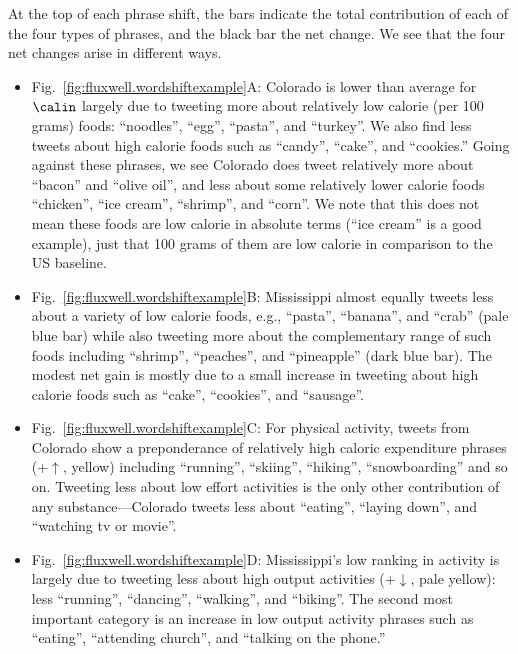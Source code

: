 At the top of each phrase shift, the bars indicate the total
contribution of each of the four types of phrases, and the black
bar the net change.
We see that the four net changes arise in different ways.
\begin{itemize}
\item 
  Fig.~\ref{fig:fluxwell.wordshiftexample}A:
  Colorado is lower than average for $\calin$ largely due
  to tweeting more about relatively low calorie (per 100 grams) foods: ``noodles'',
  ``egg'', ``pasta'', and ``turkey''.  
  We also find
  less tweets about high calorie foods such as ``candy'', ``cake'',
  and ``cookies.''
  Going against these phrases, we see 
  Colorado does tweet relatively more about ``bacon'' and ``olive oil'',
  and less about some relatively lower calorie foods ``chicken'', ``ice
  cream'', ``shrimp'', and ``corn''.
  We note that this does not mean these foods are low calorie
  in absolute terms
  (``ice cream'' is a good example),
  just that 100 grams of them are low calorie in comparison to the US
  baseline.
\item 
  Fig.~\ref{fig:fluxwell.wordshiftexample}B:
  Mississippi almost equally tweets less about a variety
  of low calorie foods, e.g., ``pasta'', ``banana'', and ``crab'' (pale blue bar) 
  while also tweeting more about the complementary range
  of such foods including ``shrimp'', ``peaches'', and ``pineapple'' (dark
  blue bar).
  The modest net gain is mostly due to a small increase
  in tweeting about high calorie foods such 
  as ``cake'', ``cookies'', and ``sausage''.
\item 
  Fig.~\ref{fig:fluxwell.wordshiftexample}C:
  For physical activity, tweets from Colorado show a preponderance
  of relatively high caloric expenditure phrases (+$\uparrow$, yellow)
  including ``running'', ``skiing'', ``hiking'', ``snowboarding'' and
  so on.
  Tweeting less about low effort activities
  is the only other contribution of any substance---Colorado 
  tweets less about ``eating'',
  ``laying down'',
  and ``watching tv or movie''.
\item 
  Fig.~\ref{fig:fluxwell.wordshiftexample}D:
  Mississippi's low ranking in activity is largely
  due to tweeting less about high output activities (+$\downarrow$, pale yellow):
  less ``running'', ``dancing'', ``walking'', and ``biking''.
  The second most important category is an increase
  in low output activity phrases such
  as ``eating'', ``attending church'', and ``talking on the phone.''
\end{itemize}

